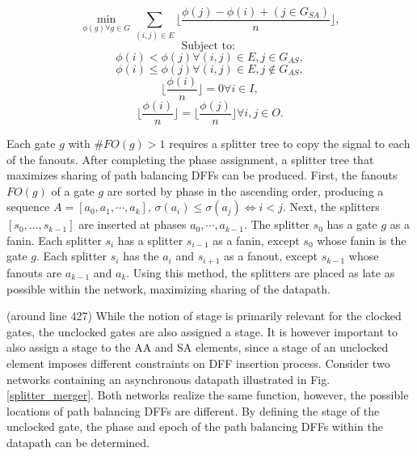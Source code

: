 \begin{equation}\label{eq:combined_cost_func}
\min\limits_{\phi \left( g \right)\forall g\in G}
\sum\limits_{ \left( i,j \right)\in E} \lfloor \frac{\phi \left( j \right)-\phi \left( i \right) + \left( j\in G_{SA} \right)}{n} \rfloor,
\end{equation}
\begin{equation*}
\text{Subject to: }
\end{equation*}
\begin{equation}
\phi \left( i \right) <    \phi \left( j \right) \forall \left( i,j \right)\in E, j\in G_{AS},
\end{equation}
\begin{equation}
\phi \left( i \right) \leq \phi \left( j \right) \forall \left( i,j \right)\in E, j\notin G_{AS},
\end{equation}
\begin{equation}
\lfloor \frac{\phi \left( i \right)}{n} \rfloor = 0  \forall i\in I,
\end{equation}
\begin{equation}
\lfloor \frac{\phi \left( i \right)}{n} \rfloor = \lfloor \frac{\phi \left( j \right)}{n} \rfloor  \forall i,j\in O.
\end{equation}

Each gate $g$ with $\#FO(g) > 1$ requires a splitter tree to copy the signal to each of the fanouts. 
After completing the phase assignment, a splitter tree that maximizes sharing of path balancing DFFs can be produced. 
First, the fanouts $FO(g)$ of a gate $g$ are sorted by phase in the ascending order, producing a sequence $A=[a_0, a_1,\cdots,a_k]$, $\sigma(a_i) \leq \sigma(a_j) \iff i<j$.
Next, the splitters $[s_0,...,s_{k-1}]$ are inserted at phases $a_0,\cdots,a_{k-1}$. 
The splitter $s_0$ has a gate $g$ as a fanin.
Each splitter $s_i$ has a splitter $s_{i-1}$ as a fanin, except $s_0$ whose fanin is the gate $g$. 
Each splitter $s_i$ has the $a_i$ and $s_{i+1}$ as a fanout, except $s_{k-1}$ whose fanouts are $a_{k-1}$ and $a_k$.
Using this method, the splitters are placed as late as possible within the network, maximizing sharing of the datapath.


(around line 427)
While the notion of stage is primarily relevant for the clocked gates, the unclocked gates are also assigned a stage.
It is however important to also assign a stage to the AA and SA elements, since a stage of an unclocked element imposes different constraints on DFF insertion process.
Consider two networks containing an asynchronous datapath illustrated in Fig. \ref{splitter_merger}.
Both networks realize the same function, however, the possible locations of path balancing DFFs are different. 
By defining the stage of the unclocked gate, the phase and epoch of the path balancing DFFs within the datapath can be determined. 






